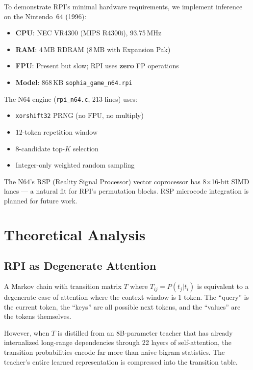 \documentclass[10pt,twocolumn]{article}
\begin{document}
To demonstrate RPI's minimal hardware requirements, we implement inference on the Nintendo~64 (1996):

\begin{itemize}
\item \textbf{CPU}: NEC VR4300 (MIPS R4300i), 93.75\,MHz
\item \textbf{RAM}: 4\,MB RDRAM (8\,MB with Expansion Pak)
\item \textbf{FPU}: Present but slow; RPI uses \textbf{zero} FP operations
\item \textbf{Model}: 868\,KB \texttt{sophia\_game\_n64.rpi}
\end{itemize}

The N64 engine (\texttt{rpi\_n64.c}, 213 lines) uses:
\begin{itemize}
\item \texttt{xorshift32} PRNG (no FPU, no multiply)
\item 12-token repetition window
\item 8-candidate top-$K$ selection
\item Integer-only weighted random sampling
\end{itemize}

The N64's RSP (Reality Signal Processor) vector coprocessor has 8$\times$16-bit SIMD lanes --- a natural fit for RPI's permutation blocks. RSP microcode integration is planned for future work.

\section{Theoretical Analysis}
\label{sec:theory}

\subsection{RPI as Degenerate Attention}

A Markov chain with transition matrix $T$ where $T_{ij} = P(t_{j} | t_{i})$ is equivalent to a degenerate case of attention where the context window is 1 token. The ``query'' is the current token, the ``keys'' are all possible next tokens, and the ``values'' are the tokens themselves.

However, when $T$ is distilled from an 8B-parameter teacher that has already internalized long-range dependencies through 22 layers of self-attention, the transition probabilities encode far more than naive bigram statistics. The teacher's entire learned representation is compressed into the transition table.
\end{document}
